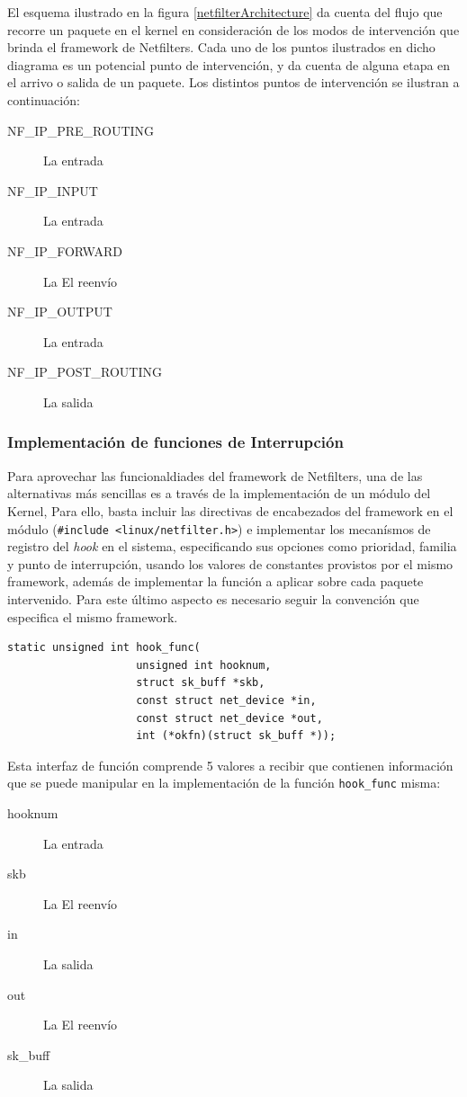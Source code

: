 El esquema ilustrado en la figura \ref{netfilterArchitecture} da cuenta del flujo que recorre un paquete en el kernel en consideración de los modos de intervención que brinda el framework de Netfilters. Cada uno de los puntos ilustrados en dicho diagrama es un potencial punto de intervención, y da cuenta de alguna etapa en el arrivo o salida de un paquete. Los distintos puntos de intervención se ilustran a continuación:

\begin{description}
\item[NF\_IP\_PRE\_ROUTING] La entrada
\item[NF\_IP\_INPUT] La entrada
\item[NF\_IP\_FORWARD] La El reenvío
\item[NF\_IP\_OUTPUT] La entrada
\item[NF\_IP\_POST\_ROUTING] La salida
\end{description}

\subsubsection{Implementación de funciones de Interrupción}

Para aprovechar las funcionaldiades del framework de Netfilters, una de las alternativas más sencillas es a través de la implementación de un módulo del Kernel, Para ello, basta incluir las directivas de encabezados del framework en el módulo (\verb=#include <linux/netfilter.h>=) e implementar los mecanísmos de registro del \emph{hook} en el sistema, especificando sus opciones como prioridad, familia y punto de interrupción, usando los valores de constantes provistos por el mismo framework, además de implementar la función a aplicar sobre cada paquete intervenido. Para este último aspecto es necesario seguir la convención que especifica el mismo framework.

\begin{lstlisting}[caption=ESO]
static unsigned int hook_func(
            		unsigned int hooknum,
            		struct sk_buff *skb, 
            		const struct net_device *in, 
            		const struct net_device *out, 
            		int (*okfn)(struct sk_buff *));
\end{lstlisting}

Esta interfaz de función comprende 5 valores a recibir que contienen información que se puede manipular en la implementación de la función \verb=hook_func= misma:
\begin{description}
\item[hooknum] La entrada
\item[skb] La El reenvío
\item[in] La salida
\item[out] La El reenvío
\item[sk\_buff] La salida
\end{description}

